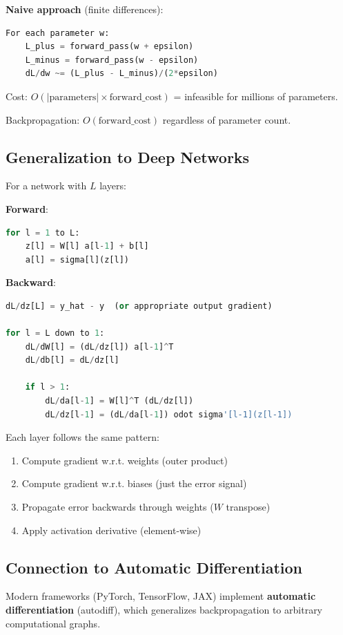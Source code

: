 \documentclass[11pt,oneside]{book}
\begin{document}
\textbf{Naive approach} (finite differences):
\begin{lstlisting}[language=Python]
For each parameter w:
    L_plus = forward_pass(w + epsilon)
    L_minus = forward_pass(w - epsilon)
    dL/dw ~= (L_plus - L_minus)/(2*epsilon)
\end{lstlisting}

Cost: $O(|\text{parameters}| \times \text{forward\_cost})$ = infeasible for millions of parameters.

Backpropagation: $O(\text{forward\_cost})$ regardless of parameter count.

\subsection{Generalization to Deep Networks}

For a network with $L$ layers:

\textbf{Forward}:
\begin{lstlisting}[language=Python]
for l = 1 to L:
    z[l] = W[l] a[l-1] + b[l]
    a[l] = sigma[l](z[l])
\end{lstlisting}

\textbf{Backward}:
\begin{lstlisting}[language=Python]
dL/dz[L] = y_hat - y  (or appropriate output gradient)

for l = L down to 1:
    dL/dW[l] = (dL/dz[l]) a[l-1]^T
    dL/db[l] = dL/dz[l]

    if l > 1:
        dL/da[l-1] = W[l]^T (dL/dz[l])
        dL/dz[l-1] = (dL/da[l-1]) odot sigma'[l-1](z[l-1])
\end{lstlisting}

Each layer follows the same pattern:
\begin{enumerate}
\item Compute gradient w.r.t. weights (outer product)
\item Compute gradient w.r.t. biases (just the error signal)
\item Propagate error backwards through weights ($W$ transpose)
\item Apply activation derivative (element-wise)
\end{enumerate}

\subsection{Connection to Automatic Differentiation}

Modern frameworks (PyTorch, TensorFlow, JAX) implement \textbf{automatic differentiation} (autodiff), which generalizes backpropagation to arbitrary computational graphs.
\end{document}
